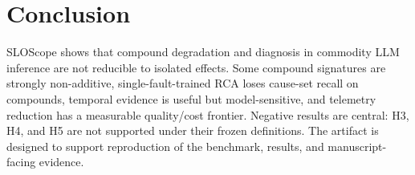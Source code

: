 \documentclass[11pt]{article}
\begin{document}
\section{Conclusion}
SLOScope shows that compound degradation and diagnosis in commodity LLM inference are not reducible to isolated effects. Some compound signatures are strongly non-additive, single-fault-trained RCA loses cause-set recall on compounds, temporal evidence is useful but model-sensitive, and telemetry reduction has a measurable quality/cost frontier. Negative results are central: H3, H4, and H5 are not supported under their frozen definitions. The artifact is designed to support reproduction of the benchmark, results, and manuscript-facing evidence.



\end{document}
